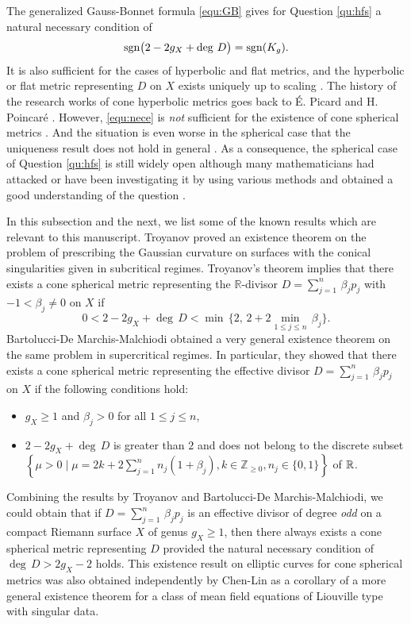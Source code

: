 \documentclass[12pt]{article}
\begin{document}
The generalized Gauss-Bonnet formula \eqref{equ:GB} gives for Question \ref{qu:hfs} a natural necessary condition of
\begin{equation}
\label{equ:nece}
 {\rm sgn} \big (2 - 2g_X + \deg \, D \big ) = {\rm sgn}(K_g).
\end{equation}
It is also sufficient for the cases of hyperbolic and flat metrics, and the hyperbolic or flat metric representing $D$ on $X$ exists uniquely up to scaling  \cite{Hei62, McOwen88, Tro86, Troyanov91}. The history of the research works of cone hyperbolic metrics goes back to {\' E}. Picard \cite{Pi1905} and H. Poincar{\' e} \cite{Po1898}. However,  \eqref{equ:nece} is {\it not} sufficient for the existence of  cone spherical metrics \cite{Tro89}. And the situation is even worse in the spherical case that the uniqueness result does not hold in general \cite[Theorem 1.5]{CWWX2015}. As a consequence, the spherical case of Question \ref{qu:hfs} is still widely open although many mathematicians had attacked or have been investigating it by using various methods and obtained a good understanding of the question \cite{BdMM11, CLW14, CWWX2015, Er04, Er1706, EGT1405, EG15, EGT1409, EGT1504, Er1905, Luo93, MP1505, MP1807, MZ1710, MZ1906, SCLX2017, Troyanov91, UY2000, XuZhu19, Zhu1902}.

In this subsection and the next, we list some of the known results which are relevant to this manuscript. Troyanov proved an existence theorem \cite[Theorem C]{Troyanov91} on the problem of prescribing the Gaussian curvature on surfaces with the conical singularities given in subcritical regimes. Troyanov's theorem implies that there exists a cone spherical metric representing the $\mathbb{R}$-divisor $D=\sum_{j=1}^n\,\beta_j p_j$ with $-1<\beta_j\not=0$ on $X$ if
\[ 0 < 2 - 2g_X + \deg \, D < \min \, \Big\{2, \, 2 + 2 \min_{1 \leq  j \leq n} \, \beta_j \Big\}. \]
Bartolucci-De Marchis-Malchiodi obtained a very general existence theorem \cite[Theorem 1.1]{BdMM11} on the same problem in supercritical regimes. In particular, they showed that there exists a cone spherical metric representing the effective divisor $D = \sum_{j = 1}^n \, \beta_j p_j$ on $X$ if the following conditions hold:
\begin{itemize}
\item $g_X \geq 1$ and $\beta_j>0$ for all $1\leq j\leq n$,
\item $2-2g_X+\deg\, D$ is greater than $2$ and does not belong to the  discrete subset
$\left \{ \mu > 0 \mid \mu = 2k + 2 \sum_{j=1}^n n_j (1 + \beta_j ), k \in \mathbb{Z}_{\geq 0}, n_j \in \{ 0,1\} \right \}$ of ${\Bbb R}$.
\end{itemize}
Combining the results by Troyanov and Bartolucci-De Marchis-Malchiodi, we could obtain that if $D = \sum_{j=1}^n\,\beta_j p_j$ is an effective divisor of  degree {\it odd} on a compact Riemann surface $X$ of genus $g_X \geq 1$, then there always exists a cone spherical metric representing $D$ provided the natural necessary condition of $\deg \, D>2g_X-2$ holds. This existence result on elliptic curves for cone spherical metrics was also obtained independently by Chen-Lin  as a corollary of a more general existence theorem \cite[Theorem 1.3]{CL15} for a class of mean field equations of Liouville type with singular data.
\end{document}
